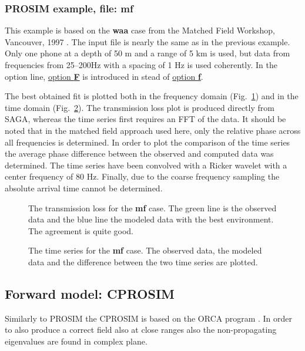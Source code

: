 \documentclass{saclantc}
\begin{document}
\subsubsection{PROSIM example, file: {\bf mf}}
\label{se:mf}
This example is based on the {\bf waa} case from the Matched Field Workshop,
Vancouver, 1997 \cite{chapman,siderius:97}. 
The input file is nearly the same as in the previous example. 
Only one phone at a depth of 50 m and a range of 5 km 
is used, but  data from frequencies from 25--200Hz
with a spacing of 1 Hz is used coherently. In the option line, 
\underline{option {\bf F}} is introduced in stead of \underline{option {\bf f}}.

The best obtained fit is plotted both in the frequency domain
(Fig.~\ref{fig:mf_freq}) and in the time domain (Fig.~\ref{fig:mf_time}).
The transmission loss plot is produced directly from {\sf SAGA},
whereas the time series first requires an FFT of the data.
It should be noted that in the matched field approach used here, only
the relative phase across all frequencies is determined.  In order to
plot the comparison of the time series the  average phase difference between
the observed and computed data was
determined. The time series have been convolved with a Ricker
wavelet with a center frequency of 80 Hz. Finally, due to the coarse
frequency sampling the absolute arrival time cannot be determined.

\begin{figure}
\epsfxsize=10cm
\centerline{}
\caption{The transmission loss for the {\bf mf} case. The green line is
the observed data and the blue line the modeled data with the best
environment.
The agreement is quite good.} 
\label{fig:mf_freq}
\end{figure}
\begin{figure}
\epsfxsize=10cm
\centerline{}
\caption{The time series for the {\bf mf} case. The observed data, the modeled
data and the difference between the two time series are plotted.} 
\label{fig:mf_time}
\end{figure}

\subsection{Forward model: CPROSIM }
Similarly to {\sc PROSIM} the {\sc CPROSIM}  
is based on
the {\sf ORCA} program \cite{levinson:asa95,westwood:asa96}. 
In order to also produce a correct field also at close ranges also the non-propagating eigenvalues are found in complex plane.
\end{document}
